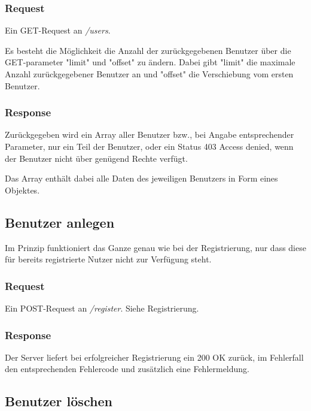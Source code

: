 \documentclass[ngerman,titlepage]{scrartcl}
\begin{document}
		\subsubsection*{Request}
		
		Ein GET-Request an \textit{/users}.
		
		Es besteht die Möglichkeit die Anzahl der zurückgegebenen Benutzer über die GET-parameter "limit" und "offset" zu ändern. Dabei gibt "limit" die maximale Anzahl zurückgegebener Benutzer an und "offset" die Verschiebung vom ersten Benutzer.
		
		\subsubsection*{Response}
		
		Zurückgegeben wird ein Array aller Benutzer bzw., bei Angabe entsprechender Parameter, nur ein Teil der Benutzer, oder ein Status 403 Access denied, wenn der Benutzer nicht über genügend Rechte verfügt.
		
		Das Array enthält dabei alle Daten des jeweiligen Benutzers in Form eines Objektes.
	
	\subsection{Benutzer anlegen}
	
		Im Prinzip funktioniert das Ganze genau wie bei der Registrierung, nur dass diese für bereits registrierte Nutzer nicht zur Verfügung steht.
	
		\subsubsection*{Request}
		
		Ein POST-Request an \textit{/register}. Siehe Registrierung.
		
		\subsubsection*{Response}
		
		Der Server liefert bei erfolgreicher Registrierung ein 200 OK zurück, im Fehlerfall den entsprechenden Fehlercode und zusätzlich eine Fehlermeldung.
	
	\subsection{Benutzer löschen}
	
\end{document}
